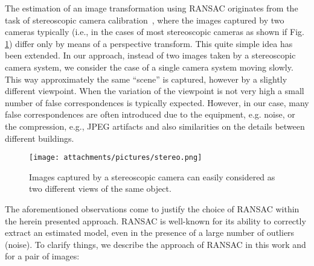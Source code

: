 The estimation of an image transformation using RANSAC originates from the task of stereoscopic camera calibration~\cite{hartley2003multiple}, where the images captured by two cameras typically (i.e., in the cases of most stereoscopic cameras as shown if Fig. \ref{fig:stereo}) differ only by means of a perspective transform. This quite simple idea has been extended. In our approach, instead of two images taken by a stereoscopic camera system, we consider the case of a single camera system moving slowly. This way approximately the same ``scene'' is captured, however by a slightly different viewpoint. When the variation of the viewpoint is not very high a small number of false correspondences is typically expected.  However, in our case, many false correspondences are often introduced due to the equipment, e.g. noise, or the compression, e.g., JPEG artifacts and also similarities on the details between different buildings.

\begin{figure}[htp!]
  \centering
  \texttt{[image: attachments/pictures/stereo.png]}
  \caption{Images captured by a stereoscopic camera can easily considered as two different views of the same object.}
  \label{fig:stereo}
\end{figure}


The aforementioned observations come to justify the choice of RANSAC within the herein presented approach. RANSAC is well-known for its ability to correctly extract an estimated model, even in the presence of a large number of outliers (noise). To clarify things, we describe the approach of RANSAC in this work and for a pair of images:

